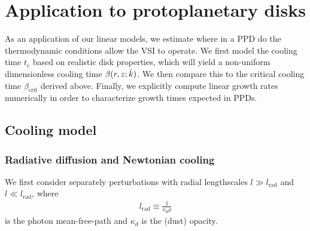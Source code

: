 \section{Application to protoplanetary disks}\label{application} 

As an application of our linear models, we estimate where in a
PPD do the thermodynamic conditions allow the VSI to
operate. We first model the cooling time $t_c$ based on realistic
disk properties, which will yield a non-uniform dimensionless cooling
time $\beta(r,z;\hat{k})$. We then compare this to the critical cooling time
$\beta_\mathrm{crit}$ derived above. Finally, we explicitly compute 
linear growth rates numerically in order to characterize 
growth times expected in PPDs.  


\subsection{Cooling model} 

\subsubsection{Radiative diffusion and Newtonian cooling}

We first consider separately perturbations with radial lengthscales
$l\gg l_\mathrm{rad}$ and $l\ll l_\mathrm{rad}$, where       
\begin{align}\label{lrad}
  l_\mathrm{rad} \equiv \frac{1}{\kappa_d\rho} 
\end{align} is the photon mean-free-path and $\kappa_d$ is the (dust)
opacity. 

